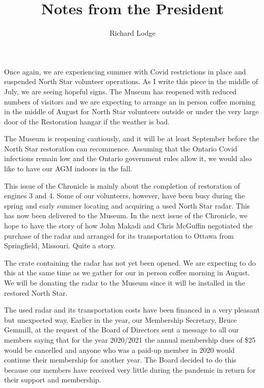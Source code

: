 
%


\title{Notes from the President}
\author{Richard Lodge}

\maketitle

Once again, we are experiencing summer with Covid restrictions in place and
suspended North Star volunteer operations.  As I write this piece in the middle
of July, we are seeing hopeful signs.  The Museum has reopened with reduced
numbers of visitors and we are expecting to arrange an in person coffee morning
in the middle of August for North Star volunteers outside or under the very
large door of the Restoration hangar if the weather is bad.

The Museum is reopening cautiously, and it will be at least September before the
North Star restoration can recommence.  Assuming that the Ontario Covid
infections remain low and the Ontario government rules allow it, we would also
like to have our AGM indoors in the fall.

This issue of the Chronicle is mainly about the completion of restoration of
engines 3 and 4. Some of our volunteers, however, have been busy during the
spring and early summer locating and acquiring a used North Star radar.  This
has now been delivered to the Museum.  In the next issue of the Chronicle, we
hope to have the story of how John Makadi and Chris McGuffin negotiated the
purchase of the radar and arranged for its transportation to Ottawa from
Springfield, Missouri.  Quite a story.

The crate containing the radar has not yet been opened.  We are expecting to do
this at the same time as we gather for our in person coffee morning in August.
We will be donating the radar to the Museum since it will be installed in the
restored North Star.

The used radar and its transportation costs have been financed in a very
pleasant but unexpected way.  Earlier in the year, our Membership Secretary,
Bruce Gemmill, at the request of the Board of Directors sent a message to all
our members saying that for the year 2020/2021 the annual membership dues of
\$25 would be cancelled and anyone who was a paid-up member in 2020 would
continue their membership for another year.  The Board decided to do this
because our members have received very little during the pandemic in return for
their support and membership.  

